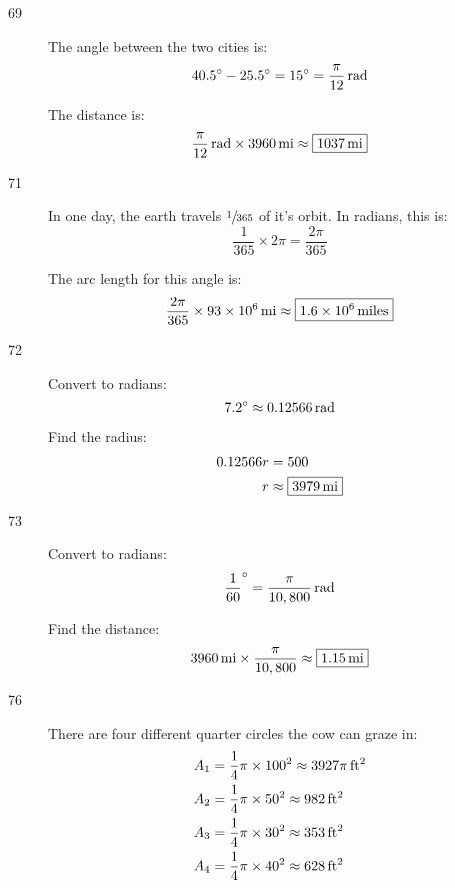 \documentclass{exam}
\newcommand{\degree}{\ensuremath{^\circ}}
\begin{document}
\begin{description}
      \item[69]
        The angle between the two cities is: 
        \[
          40.5 \degree - 25.5 \degree = 15 \degree = \unit[ \frac{\pi}{12} ]{rad}
        \]

        The distance is:
        \[
          \unit[ \frac{\pi}{12} ]{rad} \times \unit[3960]{mi} \approx \boxed{ \unit[ 1037 ]{mi} }
        \]

      \item[71]
        In one day, the earth travels $\sfrac{1}{365}$ of it's orbit.  In radians, this is:
        \[
          \frac{1}{365} \times 2 \pi = \frac{2 \pi}{365}
        \]

        The arc length for this angle is:
        \[
          \frac{2 \pi}{365} \times \unit[ 93 \times 10^6 ]{mi} \approx \boxed{ \unit[1.6 \times 10^6]{miles} }
        \]

      \item[72]
        Convert to radians:
        \[
          7.2 \degree \approx \unit[0.12566]{rad}
        \]

        Find the radius:
        \begin{align*}
          0.12566 r & = 500 \\
          r         & \approx \boxed{ \unit[3979]{mi} } \\
        \end{align*}

      \item[73]
        Convert to radians:
        \[
          \frac{1}{60} \degree = \unit[ \frac{\pi}{10,800} ]{rad}
        \]

        Find the distance:
        \[
          \unit[ 3960 ]{mi} \times \frac{\pi}{10,800} \approx \boxed{ \unit[1.15]{mi} }
        \]

      \item[76]
        There are four different quarter circles the cow can graze in:
        \begin{align*}
          A_1 &= \frac{1}{4} \pi \times 100^2 \approx \unit[3927 \pi]{ft^2} \\
          A_2 &= \frac{1}{4} \pi \times 50^2 \approx \unit[982]{ft^2} \\
          A_3 &= \frac{1}{4} \pi \times 30^2 \approx \unit[353]{ft^2} \\
          A_4 &= \frac{1}{4} \pi \times 40^2 \approx \unit[628]{ft^2} \\
        \end{align*}


\end{description}
\end{document}
